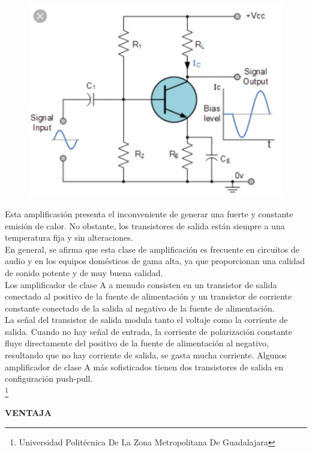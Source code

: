 \documentclass[11pt,a4paper]{article}
\begin{document}
\begin{itemize}
\begin{figure}[hbtp]
\centering
\includegraphics[scale=0.80]{ejemplo.png} 
\end{figure} 

Esta amplificación presenta el inconveniente de generar una fuerte y constante emisión de calor. No obstante, los transistores de salida están siempre a una temperatura fija y sin alteraciones.\\

En general, se afirma que esta clase de amplificación es frecuente en circuitos de audio y en los equipos domésticos de gama alta, ya que proporcionan una calidad de sonido potente y de muy buena calidad.\\

Los amplificador de clase A a menudo consisten en un transistor de salida conectado al positivo de la fuente de alimentación y un transistor de corriente constante conectado de la salida al negativo de la fuente de alimentación.\\

La señal del transistor de salida modula tanto el voltaje como la corriente de salida. Cuando no hay señal de entrada, la corriente de polarización constante fluye directamente del positivo de la fuente de alimentación al negativo, resultando que no hay corriente de salida, se gasta mucha corriente. Algunos amplificador de clase A más sofisticados tienen dos transistores de salida en configuración push-pull.\\

\footnote{Universidad Politécnica De La Zona Metropolitana De Guadalajara} 

\newpage

\textbf{VENTAJA}\\


\end{itemize}
\end{document}
